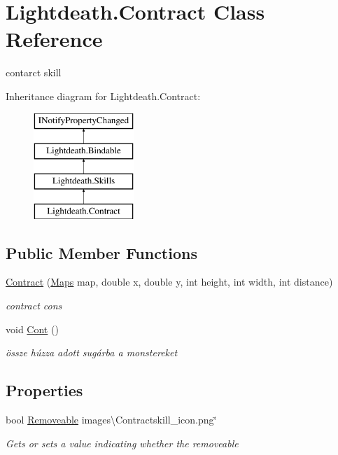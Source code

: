 \hypertarget{class_lightdeath_1_1_contract}{}\section{Lightdeath.\+Contract Class Reference}
\label{class_lightdeath_1_1_contract}


contarct skill  


Inheritance diagram for Lightdeath.\+Contract\+:\begin{figure}[H]
\begin{center}
\leavevmode
\includegraphics[height=4.000000cm]{class_lightdeath_1_1_contract}
\end{center}
\end{figure}
\subsection*{Public Member Functions}
\begin{DoxyCompactItemize}
\item 
\hyperlink{class_lightdeath_1_1_contract_a936b660ab0006875a65b25cf60cb4150}{Contract} (\hyperlink{class_lightdeath_1_1_maps}{Maps} map, double x, double y, int height, int width, int distance)
\begin{DoxyCompactList}\small\item\em contract cons \end{DoxyCompactList}\item 
void \hyperlink{class_lightdeath_1_1_contract_a87abee8cbc76b631f7a29c1adc583cc8}{Cont} ()
\begin{DoxyCompactList}\small\item\em össze húzza adott sugárba a monstereket \end{DoxyCompactList}\end{DoxyCompactItemize}
\subsection*{Properties}
\begin{DoxyCompactItemize}
\item 
bool \hyperlink{class_lightdeath_1_1_contract_a90ab7d5a59e2086bd81c77e164d63ab5}{Removeable} images\textbackslash{}\+Contractskill\+\_\+icon.\+png\char`\"{}
\begin{DoxyCompactList}\small\item\em Gets or sets a value indicating whether the removeable \end{DoxyCompactList}\end{DoxyCompactItemize}
